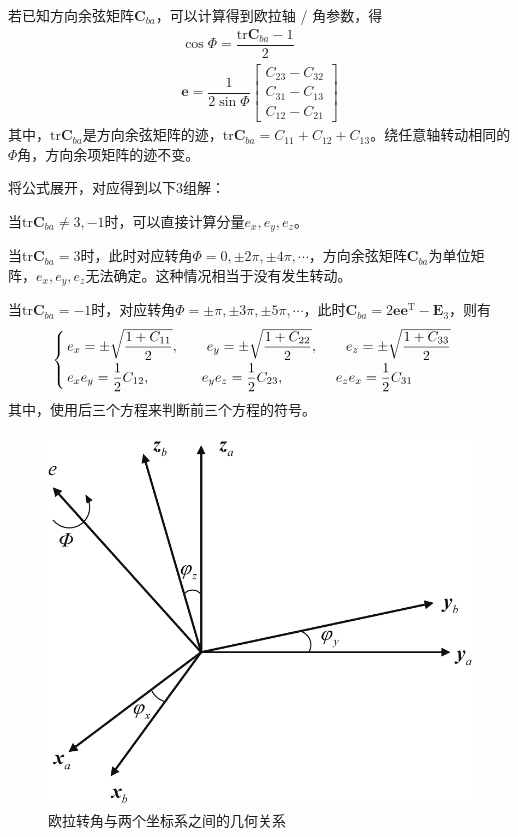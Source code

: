 
若已知方向余弦矩阵$\bm{C}_{ba}$，可以计算得到欧拉轴 / 角参数，得
\begin{align}
	\cos \varPhi = \dfrac{\text{tr} \bm{C}_{ba} - 1}{2} \\
	\bm{e} = \dfrac{1}{2 \sin \varPhi} 
	\begin{bmatrix}
		C_{23} - C_{32} \\
		C_{31} - C_{13} \\
		C_{12} - C_{21}
	\end{bmatrix}
\end{align}
其中，$\text{tr} \bm{C}_{ba}$是方向余弦矩阵的迹，$\text{tr} \bm{C}_{ba} = C_{11} + C_{12} + C_{13}$。绕任意轴转动相同的$\varPhi$角，方向余项矩阵的迹不变。
\clearpage

\noindent 将公式展开，对应得到以下3组解：

\noa[1] 当$\text{tr} \bm{C}_{ba} \neq 3, -1$时，可以直接计算分量$e_x, e_y, e_z$。

\noa[2] 当$\text{tr} \bm{C}_{ba} = 3$时，此时对应转角$\varPhi = 0, \pm 2 \pi, \pm 4 \pi, \cdots$，方向余弦矩阵$\bm{C}_{ba}$为单位矩阵，$e_x, e_y, e_z$无法确定。这种情况相当于没有发生转动。

\noa[3] 当$\text{tr} \bm{C}_{ba} = -1$时，对应转角$\varPhi = \pm \pi, \pm 3 \pi, \pm 5 \pi, \cdots$，此时$\bm{C}_{ba} = 2 \bm{e}\bm{e}^{\text{T}} - \bm{E}_3$，则有
\begin{equation}
	\begin{cases}
		\, e_x = \pm \sqrt{\dfrac{1 + C_{11}}{2}}, \qquad e_y = \pm \sqrt{\dfrac{1+ C_{22}}{2}}, \qquad e_z = \pm \sqrt{\dfrac{1 + C_{33}}{2}} \\[0.5em]
		\, e_x e_y = \dfrac{1}{2} C_{12}, \hspace*{3.7em} e_ye_z = \dfrac{1}{2}C_{23}, \hspace*{3.7em} e_ze_x = \dfrac{1}{2} C_{31}
	\end{cases}
\end{equation}
其中，使用后三个方程来判断前三个方程的符号。

\begin{figure}[!htb]
	\centering
	\includegraphics[width=0.4\linewidth]{pic/欧拉轴角变换}
	\vspace*{-1em}
	\caption{欧拉转角与两个坐标系之间的几何关系}
	\label{欧拉转角变换}
\end{figure}


